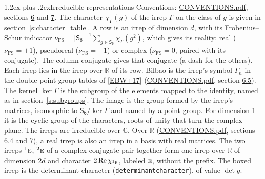 \documentclass[10pt,a4paper]{article}
\makeatletter
\renewcommand\section{\@startsection{section}{1}{\z@}{-3ex plus -1ex minus -.2ex}%
  {1.2ex plus .2ex}{\normalfont\large\sffamily\bfseries\color{parttitle}}}
\numberwithin{equation}{section}
\newcommand{\grp}[1]{\mathsf{#1}}
\newcommand{\irr}[1]{\text{\normalfont\scshape #1}}
\newcommand{\conjpair}[1]{{}^{#1}}
\newcommand{\irchar}[1]{\chi_{#1}}
\newcommand{\fsind}{\nu_{\mathrm{FS}}}
\makeatother
\begin{document}
\section{Irreducible representations}\label{s:irreps}
Conventions: \href{../../CONVENTIONS.pdf}{CONVENTIONS.pdf}, sections \href{../../CONVENTIONS.pdf\#conv.6}{6} and \href{../../CONVENTIONS.pdf\#conv.7}{7}.
\leavevmode\label{n:function.character}\label{n:irrep.Gamma}The character $\irchar{\Gamma}(g)$ of the irrep $\Gamma$ on the class of $g$ is given in section~\ref{s:character_table}.
\leavevmode\label{n:index.dimension}\label{n:index.frobenius}\label{n:head.irrep}\label{n:head.reality}A row is an irrep of dimension $d$, with its Frobenius--Schur indicator $\fsind = |\grp{S_{6}}|^{-1}\allowbreak\sum_{g\in\grp{S_{6}}}\irchar{\Gamma}(g^2)$, which gives its reality: real ($\fsind = +1$), pseudoreal ($\fsind = -1$) or complex ($\fsind = 0$, paired with its conjugate). \label{n:head.conjugate}The column conjugate gives that conjugate (a dash for the others). \label{n:head.over.real}Each irrep lies in the irrep over $\mathbb{R}$ of its row. \label{n:head.bilbao}\label{n:irrep.alias.gamma}Bilbao is the irrep's symbol $\Gamma_n$ in the double point group tables of [\href{../../../REFERENCES.pdf\#ref.EBW+17}{EBW+17}] (\href{../../CONVENTIONS.pdf}{CONVENTIONS.pdf}, section \href{../../CONVENTIONS.pdf\#conv.6.5}{6.5}). \label{n:head.kernel}The kernel $\ker\Gamma$ is the subgroup of the elements mapped to the identity, named as in section~\ref{s:subgroups}. \label{n:head.image}The image is the group formed by the irrep's matrices, isomorphic to $\grp{S_{6}}/\ker\Gamma$ and named by a point group. For dimension 1 it is the cyclic group of the characters, roots of unity that turn the complex plane. The irreps are irreducible over $\mathbb{C}$. Over $\mathbb{R}$ (\href{../../CONVENTIONS.pdf}{CONVENTIONS.pdf}, sections \href{../../CONVENTIONS.pdf\#conv.6.4}{6.4} and \href{../../CONVENTIONS.pdf\#conv.7}{7}), a real irrep is also an irrep in a basis with real matrices. The two irreps $\conjpair{1}\irr{e}$, $\conjpair{2}\irr{e}$ of a complex-conjugate pair together form one irrep over $\mathbb{R}$ of dimension $2d$ and character $2\operatorname{Re}\irchar{\conjpair{1}\irr{e}}$, labeled $\irr{e}$, without the prefix. \label{n:mark.determinant}The boxed irrep is the determinant character (\texttt{determinantcharacter}), of value $\det g$.
\setlength{\emergencystretch}{2em}\par\setlength{\emergencystretch}{0pt}
\end{document}
